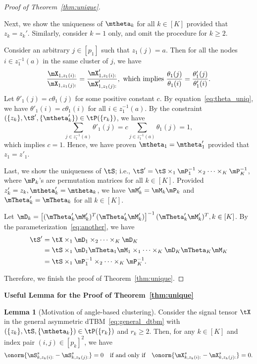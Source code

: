 \documentclass[lettersize,onecolumn,journal]{IEEEtran}
\theoremstyle{definition}
\newtheorem{lem}{Lemma}
\theoremstyle{definition}
\newcommand{\off}[1]{\left[#1\right]}
\begin{document}
\begin{proof}[Proof of Theorem~\ref{thm:unique}]
\begin{enumerate}[wide]
Next, we show the uniqueness of $\mtheta_k$ for all $k \in [K]$ provided that $z_k = z_k'$. Similarly, consider $k=1$ only, and omit the procedure for $k\geq 2$. 

Consider an arbitrary $j \in [p_1]$ such that $z_1(j) = a$. Then for all the nodes $i \in  z_1^{-1}(a)$ in the same cluster of $j$, we have 
\begin{equation}
    \frac{\mX_{1,z_1(i):}}{\mX_{1,z_1(j):}} = \frac{\mX'_{1,z_1(i):}}{\mX'_{1,z_1(j):}}, \text{ which implies }  \frac{\theta_1(j)}{\theta_1(i)} = \frac{\theta'_1(j)}{\theta'_1(i)}.\label{eq:theta_uniq}
\end{equation}
Let $\theta'_1(j) = c\theta_1(j)$ for some positive constant $c$. By equation~\eqref{eq:theta_uniq}, we have $\theta'_1(i) = c \theta_1(i)$ for all $ i \in  z_1^{-1}(a)$. By the constraint $(\{z_k\}, \tS', \{\mtheta'_k\}) \in \tP(\{r_k\})$, we have 
\begin{equation}
    \sum_{j \in z_1^{-1}(a)} \theta'_1(j) = c \sum_{j \in z_1^{-1}(a)} \theta_1(j) = 1,
\end{equation}
which implies $c = 1$. Hence, we have proven $\mtheta_1 = \mtheta'_1$ provided that $z_1 = z'_1$.

Last, we show the uniqueness of $\tS$; i.e., $\tS'=\tS\times_1 \mP^{-1}_1\times_2\cdots \times_K \mP^{-1}_K$, where $\mP_k$'s are permutation matrices for all $k\in[K]$.  Provided $z'_k = z_k, \mtheta'_k = \mtheta_k$, we have $\mM'_k = \mM_k \mP_k$ and $\mTheta'_k = \mTheta_k$ for all $k \in [K]$. 

Let $\mD_k = \off{ (\mTheta'_k \mM'_k)^T (\mTheta'_k \mM'_k) }^{-1} (\mTheta'_k \mM'_k)^T, k \in [K]$. By the parameterization~\eqref{eq:another}, we have 
\begin{align}
    \tS' &= \tX \times_1 \mD_1 \times_2 \cdots \times_K \mD_K \\
    &= \tS \times_1 \mD_1 \mTheta_1 \mM_1 \times_1 \cdots \times_K \mD_K \mTheta_K \mM_K \\
    &= \tS \times_1 \mP^{-1}_1 \times_2 \cdots \times_K \mP^{-1}_K.
\end{align}


\end{enumerate}

Therefore, we finish the proof of Theorem~\ref{thm:unique}.
\end{proof}


{\bf Useful Lemma for the Proof of Theorem~\ref{thm:unique}} 

\begin{lem}[Motivation of angle-based clustering]\label{lem:angle} Consider the signal tensor $\tX$ in the general asymmetric dTBM~\eqref{eq:general_dtbm} with $(\{z_k\},\tS,\{\mtheta_k\})\in \tP(\{r_k\})$ and $r_k \geq 2$. Then, for any $k \in [K]$ and index pair $(i,j)\in[p_k]^2$, we have 
\begin{equation}
    \onorm{ \mS_{k,z_k(i):}^s -  \mS_{k,z_k(j):}^s } = 0 \quad \text{if and only if} \quad \onorm{  \mX_{k, z_k(i):}^s -  \mX_{k,z_k(j):}^s } = 0.
\end{equation}
\end{lem}
\end{document}
